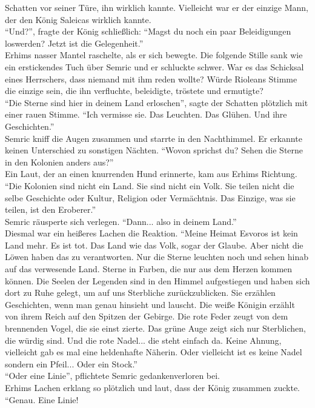 Schatten vor seiner Türe, ihn wirklich kannte. Vielleicht war er der einzige Mann, der den König 
Saleicas wirklich kannte.\\
``Und?'', fragte der König schließlich: ``Magst du noch ein paar Beleidigungen loswerden? Jetzt ist 
die Gelegenheit.''\\
Erhims nasser Mantel raschelte, als er sich bewegte. Die folgende Stille sank wie ein erstickendes 
Tuch über Semric und er schluckte schwer. War es das Schicksal eines Herrschers, dass niemand mit 
ihm reden wollte? Würde Rioleans Stimme die einzige sein, die ihn verfluchte, beleidigte, tröstete 
und ermutigte? \\
``Die Sterne sind hier in deinem Land erloschen'', sagte der Schatten plötzlich mit einer rauen 
Stimme. ``Ich vermisse sie. Das Leuchten. Das Glühen. Und ihre Geschichten.''\\
Semric kniff die Augen zusammen und starrte in den Nachthimmel. Er erkannte keinen Unterschied zu 
sonstigen Nächten. ``Wovon sprichst du? Sehen die Sterne in den Kolonien anders aus?''\\
Ein Laut, der an einen knurrenden Hund erinnerte, kam aus Erhims Richtung. ``Die Kolonien sind 
nicht ein Land. Sie sind nicht ein Volk. Sie teilen nicht die selbe Geschichte oder Kultur, Religion 
oder Vermächtnis. Das Einzige, was sie teilen, ist den Eroberer.''\\
Semric räusperte sich verlegen. ``Dann... also in deinem Land.''\\
Diesmal war ein heißeres Lachen die Reaktion. ``Meine Heimat Esvoros ist kein Land mehr. Es ist 
tot. Das Land wie das Volk, sogar der Glaube. Aber nicht die Löwen haben das zu verantworten. Nur 
die Sterne leuchten noch und sehen hinab auf das verwesende Land. Sterne in Farben, die nur aus dem 
Herzen kommen können. Die Seelen der Legenden sind in den Himmel aufgestiegen und haben sich dort 
zu Ruhe gelegt, um auf uns Sterbliche zurückzublicken. Sie erzählen Geschichten, wenn man genau 
hinsieht und lauscht. Die weiße Königin erzählt von ihrem Reich auf den Spitzen der Gebirge. Die 
rote Feder zeugt von dem brennenden Vogel, die sie einst zierte. Das grüne Auge zeigt sich nur 
Sterblichen, die würdig sind. Und die rote Nadel... die steht einfach da. Keine Ahnung, vielleicht 
gab es mal eine heldenhafte Näherin. Oder vielleicht ist es keine Nadel sondern ein Pfeil... Oder 
ein Stock.''\\
``Oder eine Linie'', pflichtete Semric gedankenverloren bei.\\
Erhims Lachen erklang so plötzlich und laut, dass der König zusammen zuckte. ``Genau. Eine Linie! 
